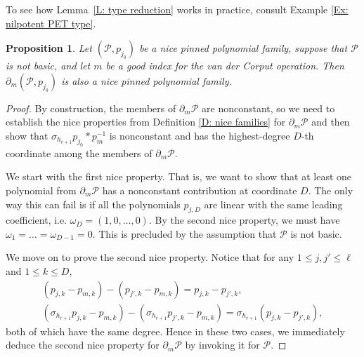 \documentclass[11pt]{amsart}
\newtheorem{proposition}[lemma]{Proposition}
\theoremstyle{definition}
\newcommand{\Z}{{\mathbb Z}}
\newcommand{\CP}{{\mathcal P}}
\newcommand{\inv}{^{-1}}
\newcommand{\1}{{\mathbf{1}}}
\begin{document}
To see how Lemma~\ref{L: type reduction} works in practice, consult Example \ref{Ex: nilpotent PET type}.


\begin{proposition}\label{P: niceness preserved}
    {Let $(\CP,p_{j_{0}})$ be a nice pinned polynomial family, suppose that $\CP$ is not basic, and let $m$ be a good index for the van der Corput operation. Then $\partial_{m}(\CP,p_{j_{0}})$ is also a nice pinned polynomial family.}
\end{proposition}



\begin{proof}
    By construction, the members of $\partial_m \CP$ are nonconstant, so we need to establish the nice properties from Definition \ref{D: nice families} for $\partial_m \CP$ and then show that $\sigma_{h_{r+1}}p_{j_0}*p_m\inv$ is nonconstant and has the highest-degree $D$-th coordinate among the members of $\partial_{m}\CP$.

        We start with the first nice property. That is, we want to show that at least one polynomial from $\partial_m\CP$ has a nonconstant contribution at coordinate $D$. The only way this can fail is if all the polynomials %
        $p_{j,D}$ are linear with the same leading coefficient, i.e. $\omega_{D}=(1,0,\dots,0)$.
        By the second nice property, we must have $\omega_{1}=\dots=\omega_{D-1}={0}$.
        This is precluded by the assumption that $\CP$ is not basic.

    We move on to prove the second nice property. Notice that for any $1\leq j,j'\leq \ell$ and $1\leq k\leq D$,
    \begin{gather}\label{E: composition 1}
        (p_{j,k}-p_{m,k})-(p_{j',k}-p_{m,k}) = p_{j,k}-p_{j',k},\\
        \label{E: composition 2}
        (\sigma_{h_{r+1}}p_{j,k}-p_{m,k})-(\sigma_{h_{r+1}}p_{j',k}-p_{m,k}) = \sigma_{h_{r+1}}(p_{j,k}-p_{j',k}),
    \end{gather}
    both of which have the same degree. Hence in these two cases, we immediately deduce the second nice property for $\partial_m\CP$ by invoking it for $\CP$.
    

\end{proof}
\end{document}
